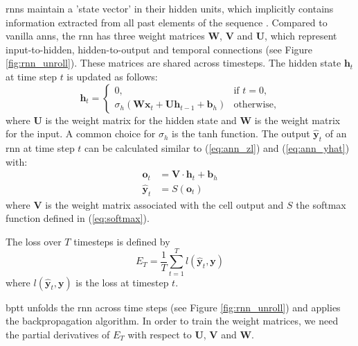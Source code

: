 \documentclass[12pt, a4paper, headinclude, twoside, plainheadsepline, open=right, numbers=noenddot, hidelinks, toc=listof, toc=bibliography]{scrreprt}
\begin{document}
\Acp{rnn} maintain a 'state vector' in their hidden units, which implicitly contains information extracted from all past elements of the sequence \cite{lecunDeepLearning2015}.
Compared to vanilla \acp{ann}, the \ac{rnn} has three weight matrices $\mathbf{W}$, $\mathbf{V}$ and $\mathbf{U}$, which represent input-to-hidden, hidden-to-output and temporal connections (see Figure \ref{fig:rnn_unroll}).
These matrices are shared across timesteps.
The hidden state $\mathbf{h}_t$ at time step $t$ is updated as follows:
\begin{equation}
\label{eq:rnn_update} 
\mathbf{h}_t =
\begin{cases}
	0, & \text{if } t = 0, \\
	\sigma_h (\mathbf{W} \mathbf{x}_t + \mathbf{U} \mathbf{h}_{t-1} + \mathbf{b}_h)
	& \text{otherwise},
\end{cases}
\end{equation}
where $\mathbf{U}$ is the weight matrix for the hidden state and $\mathbf{W}$ is the weight matrix for the input.
A common choice for $\sigma_h$ is the tanh function.
The output $\mathbf{\hat{y}}_t$ of an \ac{rnn} at time step $t$ can be calculated similar to (\ref{eq:ann_zl}) and (\ref{eq:ann_yhat}) with:
\begin{equation}
\label{eq:rnn_output}
\begin{split}
\mathbf{o}_t &= \mathbf{V} \cdot \mathbf{h}_t + \mathbf{b}_h \\
\mathbf{\hat{y}}_t &= S(\mathbf{o}_t)
\end{split}
\end{equation}
where $\mathbf{V}$ is the weight matrix associated with the cell output and $S$ the softmax function defined in (\ref{eq:softmax}). 

The loss over $T$ timesteps is defined by 
\begin{equation}
E_T = \frac{1}{T} \sum_{t=1}^{T} {l(\mathbf{\hat{y}}_t, \mathbf{y})}
\end{equation} 
where $l(\mathbf{\hat{y}}_t, \mathbf{y})$ is the loss at timestep $t$.

\Ac{bptt} unfolds the \ac{rnn} across time steps (see Figure \ref{fig:rnn_unroll}) and applies the backpropagation algorithm. 
In order to train the weight matrices, we need the partial derivatives of $E_T$ with respect to $\mathbf{U}$, $\mathbf{V}$ and $\mathbf{W}$.
\end{document}
